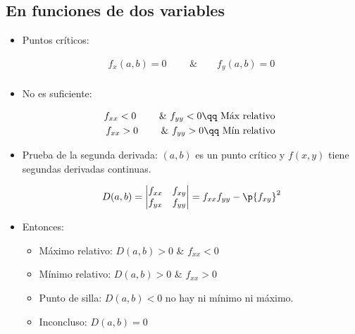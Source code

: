 \subsection{En funciones de dos variables}
\begin{itemize}
    \item Puntos críticos:
        \begin{center}
           \begin{align*}
               f_x(a,b) = 0 \qquad \text{ \& } \qquad f_y(a,b)=0 \\ 
           \end{align*}
        \end{center}
    
    \item No es suficiente:
        \begin{center}
           \begin{align*}
               f_{xx} < 0 \qquad \text{ \& } f_{yy} < 0 \qq \text{ Máx relativo } \\ 
               f_{xx} > 0 \qquad \text{ \& } f_{yy} > 0 \qq \text{ Mín relativo }\\ 
           \end{align*}
        \end{center}
    
    \item Prueba de la segunda derivada: $(a,b)$ es un punto crítico y $f(x,y)$ tiene segundas derivadas continuas.
        \begin{center}
           \begin{align*}
               D(a,b) = \begin{vmatrix}
                   f_{xx} & f_{xy} \\ 
                   f_{yx} & f_{yy} \\ 
               \end{vmatrix} = f_{xx}f_{yy} - \p{f_{xy}}^2 \\  
           \end{align*}
        \end{center}
    
    \item Entonces:
        \begin{itemize}
            \item Máximo relativo: $D(a,b) > 0$ \& $f_{xx} < 0 $
            \item Mínimo relativo: $D(a,b) > 0$ \& $f_{xx} > 0 $
            \item Punto de silla: $D(a,b) < 0$ no hay ni mínimo ni máximo.
            \item Inconcluso: $D(a,b)=0$
        \end{itemize}
    

\end{itemize}
